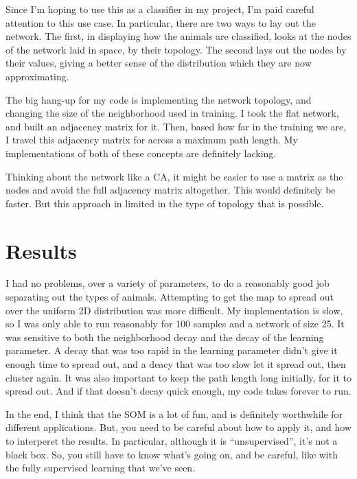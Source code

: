 \documentclass[pre,twocolumn,twoside,byrevtex,superscriptaddress]{revtex4}
\begin{document}
Since I'm hoping to use this as a classifier in my project, I'm paid careful attention to this use case.
In particular, there are two ways to lay out the network.
The first, in displaying how the animals are classified, looks at the nodes of the network laid in space, by their topology.
The second lays out the nodes by their values, giving a better sense of the distribution which they are now approximating.

The big hang-up for my code is implementing the network topology, and changing the size of the neighborhood used in training.
I took the flat network, and built an adjacency matrix for it.
Then, based how far in the training we are, I travel this adjacency matrix for across a maximum path length.
My implementations of both of these concepts are definitely lacking.

Thinking about the network like a CA, it might be easier to use a matrix as the nodes and avoid the full adjacency matrix altogether.
This would definitely be faster.
But this approach in limited in the type of topology that is possible.

\section{Results}

I had no problems, over a variety of parameters, to do a reasonably good job separating out the types of animals.
Attempting to get the map to spread out over the uniform 2D distribution was more difficult.
My implementation is slow, so I was only able to run reasonably for 100 samples and a network of size 25.
It was sensitive to both the neighborhood decay and the decay of the learning parameter.
A decay that was too rapid in the learning parameter didn't give it enough time to spread out, and a deacy that was too slow let it spread out, then cluster again.
It was also important to keep the path length long initially, for it to spread out.
And if that doesn't decay quick enough, my code takes forever to run.

In the end, I think that the SOM is a lot of fun, and is definitely worthwhile for different applications.
But, you need to be careful about how to apply it, and how to interperet the results.
In particular, although it is ``unsupervised'', it's not a black box.
So, you still have to know what's going on, and be careful, like with the fully supervised learning that we've seen.
\end{document}
